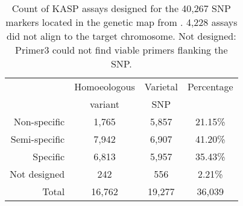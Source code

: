 
\begin{table}

\centering
\caption{Count of KASP assays designed for the 40,267 SNP markers located in the genetic map from \cite{Wang2014}. 4,228 assays did not align to the target chromosome.  Not designed: Primer3 could not find viable primers flanking the SNP.}
\label{tab:poly:designed}

\begin{tabular}{rccc}

\toprule
 & Homoeologous  &     Varietal  & Percentage\\
  &  variant &      SNP & \\
 \midrule
Non-specific&1,765&5,857&21.15\%\\
Semi-specific&7,942&6,907&41.20\%\\
Specific&6,813&5,957&35.43\%\\
Not designed &242&556&2.21\%\\
\midrule
 Total&16,762&19,277&36,039\\
\bottomrule
\end{tabular}

\end{table}